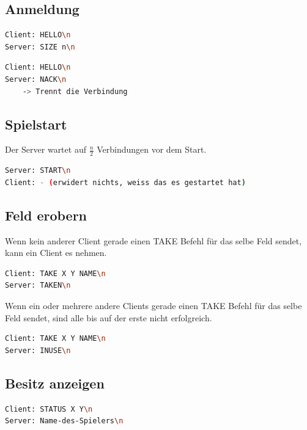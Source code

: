 \subsection{Anmeldung}
\begin{lstlisting}[language=bash,caption={Erfolgreiche Anmeldung}]
Client: HELLO\n
Server: SIZE n\n	
\end{lstlisting}

\begin{lstlisting}[language=bash,caption={Nicht erfolgreiche Anmeldung}]
Client: HELLO\n
Server: NACK\n
    -> Trennt die Verbindung
\end{lstlisting}

\subsection{Spielstart}
\label{spielstart}
Der Server wartet auf $\frac{n}{2}$ Verbindungen vor dem Start.
\begin{lstlisting}[language=bash,caption={Spielstart}]
Server: START\n
Client: - (erwidert nichts, weiss das es gestartet hat)
\end{lstlisting}

\subsection{Feld erobern}
Wenn kein anderer Client gerade einen TAKE Befehl für das selbe Feld sendet, kann ein Client es nehmen.
\begin{lstlisting}[language=bash,caption={Erfolgreiche Eroberung}]
Client: TAKE X Y NAME\n
Server: TAKEN\n
\end{lstlisting}

Wenn ein oder mehrere andere Clients gerade einen TAKE Befehl für das selbe Feld sendet, sind alle bis auf der erste nicht erfolgreich.

\begin{lstlisting}[language=bash,caption={Nichterfolgreiche Eroberung}]
Client: TAKE X Y NAME\n
Server: INUSE\n
\end{lstlisting}

\subsection{Besitz anzeigen}
\begin{lstlisting}[language=bash,caption={Spielstart}]
Client: STATUS X Y\n
Server: Name-des-Spielers\n
\end{lstlisting}

